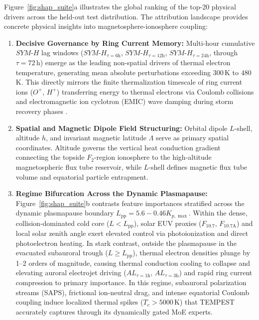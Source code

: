 \documentclass{agujournal2019}
\begin{document}
Figure~\ref{fig:shap_suite}a illustrates the global ranking of the top-20 physical drivers across the held-out test distribution. The attribution landscape provides concrete physical insights into magnetosphere-ionosphere coupling:
\begin{enumerate}
    \item \textbf{Decisive Governance by Ring Current Memory:} Multi-hour cumulative $SYM\text{-}H$ lag windows ($SYM\text{-}H_{\tau=6\mathrm{h}}$, $SYM\text{-}H_{\tau=12\mathrm{h}}$, $SYM\text{-}H_{\tau=24\mathrm{h}}$, through $\tau=72$\,h) emerge as the leading non-spatial drivers of thermal electron temperature, generating mean absolute perturbations exceeding $300$\,K to $480$\,K. This directly mirrors the finite thermalization timescale of ring current ions ($O^+$, $H^+$) transferring energy to thermal electrons via Coulomb collisions and electromagnetic ion cyclotron (EMIC) wave damping during storm recovery phases \citep{kozyra_high-altitude_1997,ferradas_effects_2023}.
    \item \textbf{Spatial and Magnetic Dipole Field Structuring:} Orbital dipole $L$-shell, altitude $h$, and invariant magnetic latitude $\Lambda$ serve as primary spatial coordinates. Altitude governs the vertical heat conduction gradient connecting the topside $F_2$-region ionosphere to the high-altitude magnetospheric flux tube reservoir, while $L$-shell defines magnetic flux tube volume and equatorial particle entrapment.
    \item \textbf{Regime Bifurcation Across the Dynamic Plasmapause:} Figure~\ref{fig:shap_suite}b contrasts feature importances stratified across the dynamic plasmapause boundary $L_{\text{pp}} = 5.6 - 0.46 K_{p,\max}$. Within the dense, collision-dominated cold core ($L < L_{\text{pp}}$), solar EUV proxies ($F_{10.7}$, $F_{10.7\mathrm{A}}$) and local solar zenith angle exert elevated control via photoionization and direct photoelectron heating. In stark contrast, outside the plasmapause in the evacuated subauroral trough ($L \ge L_{\text{pp}}$), thermal electron densities plunge by 1--2 orders of magnitude, causing thermal conduction cooling to collapse and elevating auroral electrojet driving ($AL_{\tau=1\mathrm{h}}$, $AL_{\tau=3\mathrm{h}}$) and rapid ring current compression to primary importance. In this regime, subauroral polarization streams (SAPS), frictional ion-neutral drag, and intense equatorial Coulomb coupling induce localized thermal spikes ($T_e > 5000$\,K) that TEMPEST accurately captures through its dynamically gated MoE experts.
\end{enumerate}
\end{document}
